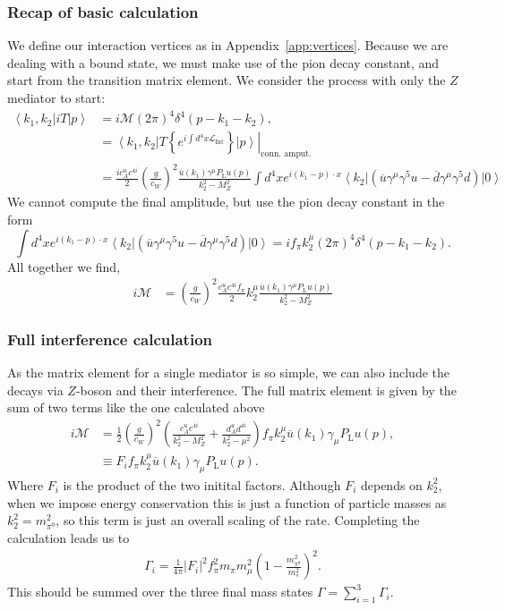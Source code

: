 \documentclass[11pt, a4paper]{article}
\newcommand{\refapp}[1]{Appendix~\ref{#1}}
\begin{document}
\subsubsection{Recap of basic calculation}

We define our interaction vertices as in \refapp{app:vertices}.
%
Because we are dealing with a bound state, we must make use of the pion decay constant, and start from the transition matrix element. We consider the process with only the $Z$ mediator to start:
%
\begin{align*}   \left\langle k_1, k_2\right| iT \left|p\right\rangle &= i\mathcal{M}(2\pi)^4\delta^4(p-k_1-k_2), \\
%
&= \left.\left\langle k_1,k_2\right|T\left\{e^{i\int d^4x \mathcal{L}_\text{Int}} \right\} \left|p\right\rangle\right|_\text{conn. amput.}\\
%
&= \frac{ic^u_Ac^{4i}}{2}\left(\frac{g}{c_W}\right)^2 \frac{\overline{u}(k_1) \gamma^\mu P_\text{L} u(p)}{k_2^2-M_Z^2}\int d^4x e^{i(k_1-p)\cdot x} \left\langle k_2\right| \left(\overline{u}\gamma^\mu\gamma^5u - \overline{d}\gamma^\mu\gamma^5d\right)\left|0\right\rangle 
%
\end{align*}
%
We cannot compute the final amplitude, but use the pion decay constant in the form  
%
\[ \int d^4x e^{i(k_1-p)\cdot x}  \left\langle k_2\right| \left(\overline{u}\gamma^\mu\gamma^5u - \overline{d}\gamma^\mu\gamma^5d\right)\left|0\right\rangle = if_\pi k_2^\mu (2\pi)^4\delta^4(p-k_1-k_2).  \]
%
All together we find, 
%
\begin{align*}
%
i\mathcal{M} &= \left(\frac{g}{c_W}\right)^2\frac{c^u_A c^{4i} f_\pi }{2} k_2^\mu\frac{\overline{u}(k_1) \gamma^\mu P_\text{L} u(p)}{k_2^2-M_Z^2}
%
\end{align*}

\subsubsection{Full interference calculation}

As the matrix element for a single mediator is so simple, we can also include the decays via
$Z$-boson and their interference. The full matrix element is given by the sum of two terms like the one calculated above
%
\begin{align*}
%
i\mathcal{M} &= \frac{1}{2}\left(\frac{g}{c_W}\right)^2\left(\frac{c^u_A c^{4i}}{k_2^2-M_Z^2} + \frac{d^u_A d^{4i} }{k_2^2-\mu^2} \right) f_\pi k_2^\mu \overline{u}(k_1) \gamma_\mu P_\text{L} u(p),\\
%
&\equiv F_i f_\pi k_2^\mu 
\overline{u}(k_1) \gamma_\mu P_\text{L} u(p). 
%
\end{align*}
%
Where $F_i$ is the product of the two initital factors. Although $F_i$ depends on $k_2^2$, when we impose energy conservation this is just a function of particle masses as $k_2^2=m_{\pi^0}^2$, so this term is just an overall scaling of the rate. Completing the calculation leads us to 
%
\begin{align*}
%
\Gamma_i = \frac{1}{4\pi}\left|F_i\right|^2 f^2_\pi m_\pi m_\mu^2\left(1-\frac{m^2_{\pi^0}}{m^2_s}\right)^2.
%
\end{align*}
%
This should be summed over the three final mass states $\Gamma = \sum_{i=1}^3 \Gamma_i$.
\end{document}
